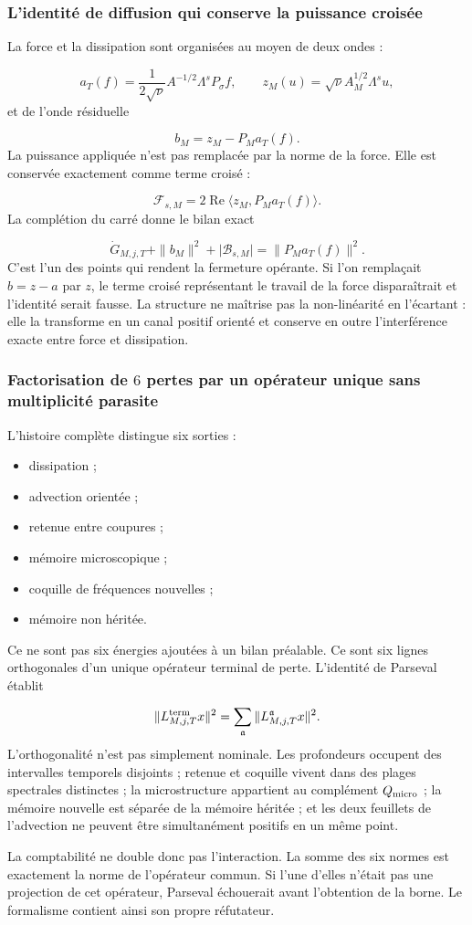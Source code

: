 \subsubsection{L’identité de diffusion qui conserve la puissance croisée}
La force et la dissipation sont organisées au moyen de deux ondes :\par
\[
a_T(f)
=
\frac{1}{2\sqrt\nu}A^{-1/2}\Lambda^sP_\sigma f,
\qquad
z_M(u)=\sqrt\nu A_M^{1/2}\Lambda^su,
\]
et de l’onde résiduelle\par
\[
b_M=z_M-P_Ma_T(f).
\]
La puissance appliquée n’est pas remplacée par la norme de la force. Elle est conservée exactement comme terme croisé :\par
\[
\mathscr F_{s,M}
=
2\operatorname{Re}\langle z_M,P_Ma_T(f)\rangle.
\]
La complétion du carré donne le bilan exact\par
\[
\dot G_{M,j,T}
+\|b_M\|^2
+\lvert\mathscr B_{s,M}\rvert
=
\|P_Ma_T(f)\|^2.
\]
C’est l’un des points qui rendent la fermeture opérante. Si l’on remplaçait \(b=z-a\) par \(z\), le terme croisé représentant le travail de la force disparaîtrait et l’identité serait fausse. La structure ne maîtrise pas la non-linéarité en l’écartant : elle la transforme en un canal positif orienté et conserve en outre l’interférence exacte entre force et dissipation.\par
{}
\subsubsection{Factorisation de \(6\) pertes par un opérateur unique sans multiplicité parasite}
L’histoire complète distingue six sorties :\par
\begin{itemize}
\item dissipation ;
\item advection orientée ;
\item retenue entre coupures ;
\item mémoire microscopique ;
\item coquille de fréquences nouvelles ;
\item mémoire non héritée.
\end{itemize}
Ce ne sont pas six énergies ajoutées à un bilan préalable. Ce sont six lignes orthogonales d’un unique opérateur terminal de perte. L’identité de Parseval établit\par
\[
\|L_{M,j,T}^{\rm term}x\|^2
=
\sum_{\mathfrak a}
\|L_{M,j,T}^{\mathfrak a}x\|^2.
\]
L’orthogonalité n’est pas simplement nominale. Les profondeurs occupent des intervalles temporels disjoints ; retenue et coquille vivent dans des plages spectrales distinctes ; la microstructure appartient au complément \(Q_{\rm micro}\) ; la mémoire nouvelle est séparée de la mémoire héritée ; et les deux feuillets de l’advection ne peuvent être simultanément positifs en un même point.\par
La comptabilité ne double donc pas l’interaction. La somme des six normes est exactement la norme de l’opérateur commun. Si l’une d’elles n’était pas une projection de cet opérateur, Parseval échouerait avant l’obtention de la borne. Le formalisme contient ainsi son propre réfutateur.\par
{}
